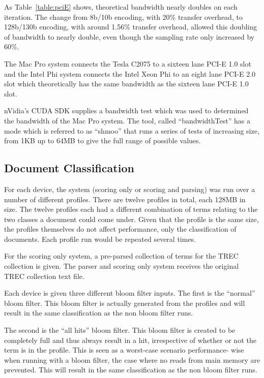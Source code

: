 As Table~\ref{table:pciE} shows, theoretical bandwidth nearly doubles on each
iteration. The change from 8b/10b encoding, with 20\% transfer overhead, to
128b/130b encoding, with around 1.56\% transfer overhead, allowed this doubling
of bandwidth to nearly double, even though the sampling rate only increased by
60\%.

The Mac Pro system connects the Tesla C2075 to a sixteen lane PCI-E 1.0 slot and
the Intel Phi system connects the Intel Xeon Phi to an eight lane PCI-E 2.0 slot
which theoretically has the same bandwidth as the sixteen lane PCI-E 1.0 slot.

nVidia's CUDA SDK supplies a bandwidth test which was used to determined the
bandwidth of the Mac Pro system. The tool, called ``bandwidthTest'' has a mode
which is referred to as ``shmoo'' that runs a series of tests of increasing
size, from 1KB up to 64MB to give the full range of possible values.

\subsection{Document Classification}

For each device, the system (scoring only or scoring and parsing) was run over a
number of different profiles. There are twelve profiles in total, each 128MB in
size. The twelve profiles each had a different combination of terms relating to
the two classes a document could come under. Given that the profile is the same
size, the profiles themselves do not affect performance, only the classification
of documents. Each profile run would be repeated several times.

For the scoring only system, a pre-parsed collection of terms for the TREC
collection is given. The parser and scoring only system receives the original
TREC collection text file.

Each device is given three different bloom filter inputs. The first is the
``normal'' bloom filter. This bloom filter is actually generated from the
profiles and will result in the same classification as the non bloom filter
runs.

The second is the ``all hits'' bloom filter. This bloom filter is created to be
completely full and thus always result in a hit, irrespective of whether or not
the term is in the profile. This is seen as a worst-case scenario performance-
wise when running with a bloom filter, the case where no reads from main memory
are prevented. This will result in the same classification as the non bloom
filter runs.

